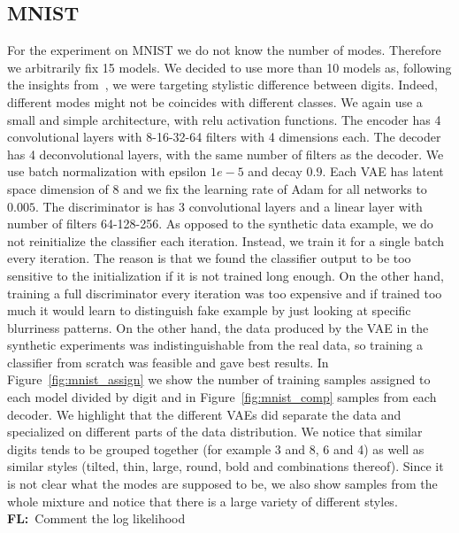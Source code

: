 \documentclass{article}
\newcommand{\FL}[1]{\textbf{\color{violet}FL:}{~\color{cyan}#1}}
\begin{document}
\subsection{MNIST}
For the experiment on MNIST we do not know the number of modes. Therefore we arbitrarily fix 15 models. We decided to use more than 10 models as, following the insights from~\cite{Tolstikhin:2017wo}, we were targeting stylistic difference between digits. Indeed, different modes might not be coincides with different classes. 
We again use a small and simple architecture, with relu activation functions. The encoder has 4 convolutional layers with 8-16-32-64 filters with 4 dimensions each. The decoder has 4 deconvolutional layers, with  the same number of filters as the decoder. We use batch normalization with epsilon $1e-5$ and decay $0.9$. Each VAE has latent space dimension of $8$ and we fix the learning rate of Adam for all networks to $0.005$. 
The discriminator is has 3 convolutional layers and a linear layer with number of filters 64-128-256. As opposed to the synthetic data example, we do not reinitialize the classifier each iteration. Instead, we train it for a single batch every iteration. The reason is that we found the classifier output to be too sensitive to the initialization if it is not trained long enough. On the other hand, training a full discriminator every iteration was too expensive and if trained too much it would learn to distinguish fake example by just looking at specific blurriness patterns. On the other hand, the data produced by the VAE in the synthetic experiments was indistinguishable from the real data, so training a classifier from scratch was feasible and gave best results.
In Figure~\ref{fig:mnist_assign} we show the number of training samples assigned to each model divided by digit and in Figure~\ref{fig:mnist_comp} samples from each decoder. We highlight that the different VAEs did separate the data and specialized on different parts of the data distribution. We notice that similar digits tends to be grouped together (for example 3 and 8, 6 and 4) as well as similar styles (tilted, thin, large, round, bold and combinations thereof). Since it is not clear what the modes are supposed to be, we also show samples from the whole mixture and notice that there is a large variety of different styles.
\FL{Comment the log likelihood}
\end{document}
